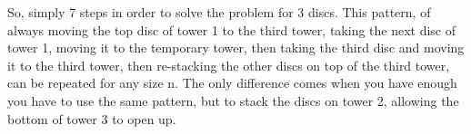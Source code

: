 \documentclass[11pt]{article}
\begin{document}
\begin{enumerate}
So, simply 7 steps in order to solve the problem for 3 discs. This pattern, of always moving the top disc of tower 1  to the third tower, taking the next disc of tower 1, moving it to the temporary tower, then taking the third disc and moving it to the third tower, then re-stacking the other discs on top of the third tower, can be repeated for any size n. The only difference comes when you have enough you have to use the same pattern, but to stack the discs on tower 2, allowing the bottom of tower 3 to open up. 



\end{enumerate}
\end{document}
